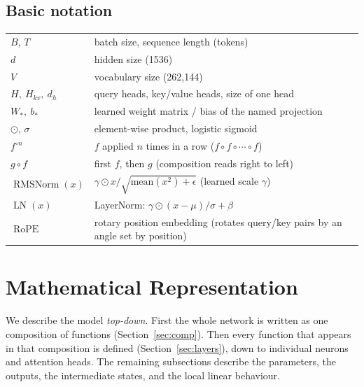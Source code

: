 \documentclass[10pt,a4paper]{article}
\newcommand{\op}[1]{\operatorname{#1}}
\theoremstyle{definition}
\begin{document}
\subsection*{Basic notation}
\begin{tabular}{ll}
\toprule
$B$, $T$ & batch size, sequence length (tokens) \\
$d$ & hidden size (1536) \\
$V$ & vocabulary size (262,144) \\
$H,\ H_{kv},\ d_h$ & query heads, key/value heads, size of one head \\
$W_\ast,\ b_\ast$ & learned weight matrix / bias of the named projection \\
$\odot$, $\sigma$ & element-wise product, logistic sigmoid \\
$f^{\circ n}$ & $f$ applied $n$ times in a row ($f\circ f\circ\cdots\circ f$) \\
$g \circ f$ & first $f$, then $g$ (composition reads right to left) \\
$\op{RMSNorm}(x)$ & $\gamma \odot x / \sqrt{\mathrm{mean}(x^2)+\epsilon}$ (learned scale $\gamma$) \\
$\op{LN}(x)$ & LayerNorm: $\gamma\odot(x-\mu)/\sigma + \beta$ \\
$\op{RoPE}$ & rotary position embedding (rotates query/key pairs by an angle set by position) \\
\bottomrule
\end{tabular}
\section{Mathematical Representation}\label{sec:func}
We describe the model \emph{top-down}. First the whole network is written as one composition of functions (Section~\ref{sec:comp}). Then every function that appears in that composition is defined (Section~\ref{sec:layers}), down to individual neurons and attention heads. The remaining subsections describe the parameters, the outputs, the intermediate states, and the local linear behaviour.
\end{document}
